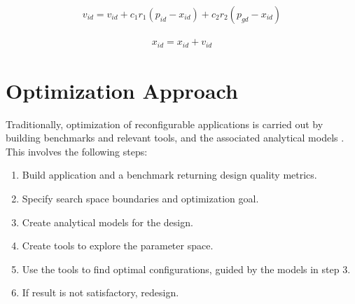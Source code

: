 \documentclass[10pt,conference,a4paper]{IEEEtran}
\begin{document}


\begin{align} 
\label{eq:pso1}
v_{id}=v_{id}+c_{1}r_{1}(p_{id}-x_{id}) + c_{2}r_{2}(p_{gd}-x_{id})
\end{align}



\begin{align} 
\label{eq:pso2}
x_{id}=x_{id}+v_{id} 
\end{align}



\section{Optimization Approach} 
\label{design}

Traditionally, optimization of reconfigurable applications is carried out by building benchmarks and relevant tools, and the associated analytical models \cite{Anson2012Quad,Becker:2009:PDR:1530588.1530595}. This involves the following steps:


\begin{enumerate}\addtolength{\itemsep}{-0.1\baselineskip}  
\item Build application and a benchmark returning design quality metrics.
\item Specify search space boundaries and optimization goal.
\item Create analytical models for the design.
\item Create tools to explore the parameter space.
\item Use the tools to find optimal configurations, guided by the models in step 3.
\item If result is not satisfactory, redesign.
\end{enumerate}

\end{document}
